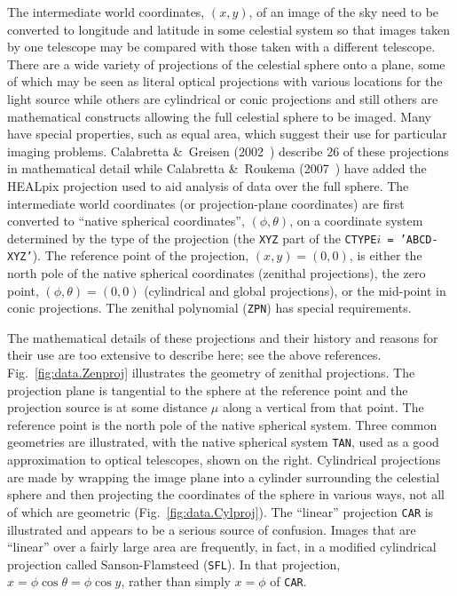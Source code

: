 \documentclass[twoside]{article}
\newcommand{\keyw}[1]{\hbox{{\tt #1}}}
\begin{document}
The intermediate world coordinates, $(x,y)$, of an image of the sky
need to be converted to longitude and latitude in some celestial
system so that images taken by one telescope may be compared with
those taken with a different telescope.  There are a wide variety of
projections of the celestial sphere onto a plane, some of which may be
seen as literal optical projections with various locations for the
light source while others are cylindrical or conic projections and
still others are mathematical constructs allowing the full celestial
sphere to be imaged.  Many have special properties, such as equal
area, which suggest their use for particular imaging problems.
Calabretta \&\ Greisen (2002~\cite{CG02}) describe 26 of these
projections in mathematical detail while Calabretta \&\ Roukema
(2007~\cite{CR07}) have added the HEALpix projection used to aid
analysis of data over the full sphere.  The intermediate world
coordinates (or projection-plane coordinates) are first converted to
``native spherical coordinates'', $(\phi,\theta)$, on a coordinate
system determined by the type of the projection (the \keyw{XYZ} part
of the \keyw{CTYPE$i$ = 'ABCD-XYZ'}).  The reference point of the
projection, $(x,y) = (0,0)$, is either the north pole of the native
spherical coordinates (zenithal projections), the zero point,
$(\phi,\theta) = (0,0)$ (cylindrical and global projections), or the
mid-point in conic projections.  The zenithal polynomial (\keyw{ZPN})
has special requirements.

The mathematical details of these projections and their history and
reasons for their use are too extensive to describe here; see the
above references.  Fig.~\ref{fig:data.Zenproj} illustrates the
geometry of zenithal projections.  The projection plane is tangential
to the sphere at the reference point and the projection source is at
some distance $\mu$ along a vertical from that point.  The reference
point is the north pole of the native spherical system.  Three common
geometries are illustrated, with the native spherical system
\keyw{TAN}, used as a good approximation to optical telescopes, shown
on the right.  Cylindrical projections are made by wrapping the image
plane into a cylinder surrounding the celestial sphere and then
projecting the coordinates of the sphere in various ways, not all of
which are geometric (Fig.~\ref{fig:data.Cylproj}).  The ``linear''
projection \keyw{CAR} is illustrated and appears to be a serious source
of confusion.  Images that are ``linear'' over a fairly large area are
frequently, in fact, in a modified cylindrical projection called
Sanson-Flamsteed (\keyw{SFL}).  In that projection, $x = \phi \cos
\theta = \phi \cos y$, rather than simply $x = \phi$ of \keyw{CAR}\@.
\end{document}
